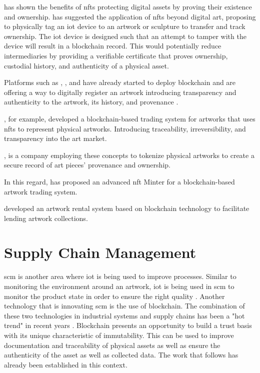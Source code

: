 \textcite{nftopportunities} has shown the benefits of \glspl{nft} protecting digital assets by proving their existence and ownership. \textcite{creativeindustry} has suggested the application of \glspl{nft} beyond digital art, proposing to physically tag an \gls{iot} device to an artwork or sculpture to transfer and track ownership. The \gls{iot} device is designed such that an attempt to tamper with the device will result in a blockchain record. This would potentially reduce intermediaries by providing a verifiable certificate that proves ownership, custodial history, and authenticity of a physical asset.

Platforms such as \textcite{artory}, \textcite{4art}, and \textcite{verisart} have already started to deploy blockchain and are offering a way to digitally register an artwork introducing transparency and authenticity to the artwork, its history, and provenance \cite{bcartmarket}.


\textcite{artchain}, for example, developed a blockchain-based trading system for artworks that uses \glspl{nft} to represent physical artworks. Introducing traceability, irreversibility, and transparency into the art market. 

\textcite{artory}, is a company employing these concepts to tokenize physical artworks to create a secure record of art pieces' provenance and ownership.


In this regard, \textcite{nftminter} has proposed an advanced \gls{nft} Minter for a blockchain-based artwork trading system. 

\textcite{artrentalblockchain} developed an artwork rental system based on blockchain technology to facilitate lending artwork collections.


\section{Supply Chain Management}
\gls{scm} is another area where \gls{iot} is being used to improve processes. Similar to monitoring the environment around an artwork, \gls{iot} is being used in \gls{scm} to monitor the product state in order to ensure the right quality \cite{iotsupplychains}. Another technology that is innovating \gls{scm} is the use of blockchain. The combination of these two technologies in industrial systems and supply chains has been a "hot trend" in recent years \cite{industryiot}. Blockchain presents an opportunity to build a trust basis with its unique characteristic of immutability. This can be used to improve documentation and traceability of physical assets as well as ensure the authenticity of the asset as well as collected data. The work that follows has already been established in this context.

